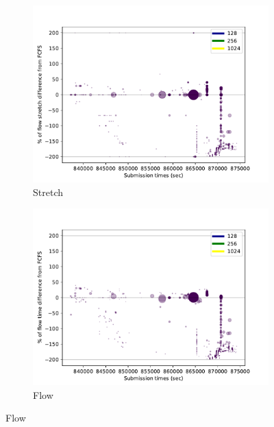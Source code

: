 \documentclass[a4paper]{article}
\begin{document}
\begin{figure}[H]\centering
\begin{subfigure}[b]{0.4\linewidth}\centering\includegraphics[width=1\linewidth]{MBSS/plot/Stretch_times_Fcfs_Fcfs_with_a_score_x0_x70000_x0_2022-02-08->2022-02-08_reduced_95_128_4_256_1_1024.pdf}\caption{Stretch}\end{subfigure}
\begin{subfigure}[b]{0.4\linewidth}\centering\includegraphics[width=1\linewidth]{MBSS/plot/Flow_times_Fcfs_Fcfs_with_a_score_x0_x70000_x0_2022-02-08->2022-02-08_reduced_95_128_4_256_1_1024.pdf}\caption{Flow}\end{subfigure}

\end{figure}
\end{document}
